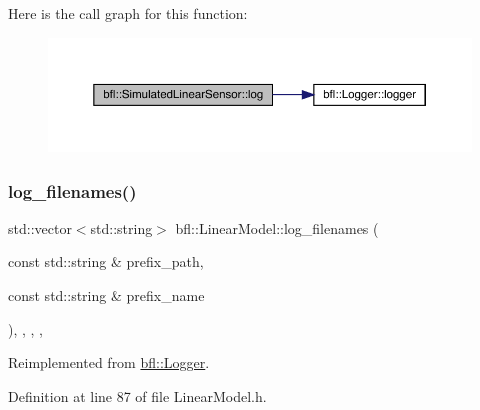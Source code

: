 Here is the call graph for this function\+:
\nopagebreak
\begin{figure}[H]
\begin{center}
\leavevmode
\includegraphics[width=350pt]{classbfl_1_1SimulatedLinearSensor_ab75bbe744d8516c97dfc90ad499b10e6_cgraph}
\end{center}
\end{figure}
\mbox{\label{classbfl_1_1LinearModel_a8b8f645a7b7d8ebbb02c8958428fcf10}} 
\subsubsection{\texorpdfstring{log\+\_\+filenames()}{log\_filenames()}}
{\footnotesize\ttfamily std\+::vector$<$std\+::string$>$ bfl\+::\+Linear\+Model\+::log\+\_\+filenames (\begin{DoxyParamCaption}\item[{const std\+::string \&}]{prefix\+\_\+path,  }\item[{const std\+::string \&}]{prefix\+\_\+name }\end{DoxyParamCaption})\hspace{0.3cm}{\ttfamily [inline]}, {\ttfamily [override]}, {\ttfamily [protected]}, {\ttfamily [virtual]}, {\ttfamily [inherited]}}



Reimplemented from \mbox{\hyperlink{classbfl_1_1Logger_a328ceaa8e70e6918f11142b12b8be217}{bfl\+::\+Logger}}.



Definition at line 87 of file Linear\+Model.\+h.

\mbox{\label{classbfl_1_1Logger_a1033ff31398484f2132f84fd140da9e3}} 
